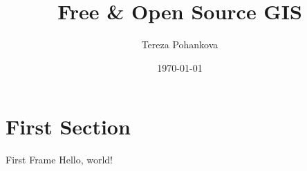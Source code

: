 \documentclass{beamer}
\title{Free \& Open Source GIS}
\date{\today}
\author{Tereza Pohankova}
\institute{Department of Geoinformatics, Palacky University Olomouc}
\begin{document}
     
        \maketitle
        \section{First Section}
        \begin{frame}{First Frame}
        Hello, world!
        \end{frame}

    
\end{document}
